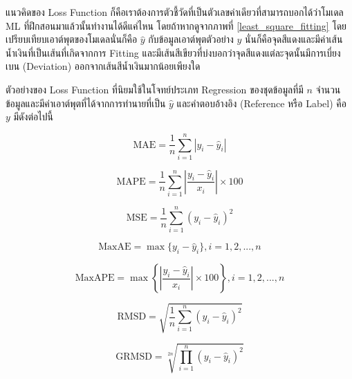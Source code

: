 แนวคิดของ Loss Function ก็คือเราต้องการตัวชี้วัดที่เป็นตัวเลขค่าเดียวที่สามารถบอกได้ว่าโมเดล ML ที่ฝึกสอนมาแล้วนั้นทำงานได้ดีแค่ไหน 
โดยถ้าหากดูจากภาพที่ \ref{least_square_fitting} โดยเปรียบเทียบเอาต์พุตของโมเดลนั่นก็คือ $\hat{y}$ กับข้อมูลเอาต์พุตตัวอย่าง $y$ 
นั่นก็คือจุดสีแดงและมีค่าเส้นน้ำเงินที่เป็นเส้นที่เกิดจากการ Fitting และมีเส้นสีเขียวที่บ่งบอกว่าจุดสีแดงแต่ละจุดนั้นมีการเบี่ยงเบน (Deviation) 
ออกจากเส้นสีน้ำเงินมากน้อยเพียงใด

ตัวอย่างของ Loss Function ที่นิยมใช้ในโจทย์ประเภท Regression ของชุดข้อมูลที่มี $n$ จำนวนข้อมูลและมีค่าเอาต์พุตที่ได้จากการทำนายที่เป็น 
$\hat{y}$ และคำตอบอ้างอิง (Reference หรือ Label) คือ $y$ มีดังต่อไปนี้

\begin{equation}\label{eq:mae}
    \text{MAE} = \frac{1}{n} \sum_{i=1}^{n} | y_{i} - \hat{y}_{i} |
\end{equation}

\begin{equation}\label{eq:mape}
    \text{MAPE} = \frac{1}{n} \sum_{i=1}^{n} \left| \frac{y_{i} - \hat{y}_{i}}{x_{i}} \right| \times 100
\end{equation}

\begin{equation}\label{eq:mse}
    \text{MSE} = \frac{1}{n} \sum_{i=1}^{n} \left( y_{i} - \hat{y}_{i} \right)^2
\end{equation}

\begin{equation}\label{eq:maxae}
    \text{MaxAE} = \max\{y_{i} - \hat{y}_{i}\}, i = 1, 2, ..., n
\end{equation}

\begin{equation}\label{eq:maxape}
    \text{MaxAPE} = \max\left\{\left| \frac{y_{i} - \hat{y}_{i}}{x_{i}} \right| \times 100 \right\}, i = 1, 2, 
    ..., n
\end{equation}

\begin{equation}\label{eq:rmsd}
    \text{RMSD} = \sqrt{ \frac{1}{n} \sum_{i=1}^{n} (y_{i} - \hat{y}_{i})^{2} }
\end{equation}

\begin{equation}\label{eq:grmsd}
    \text{GRMSD} = \sqrt[2n]{ \prod_{i=1}^{n} (y_{i} - \hat{y}_{i})^{2} }
\end{equation}

